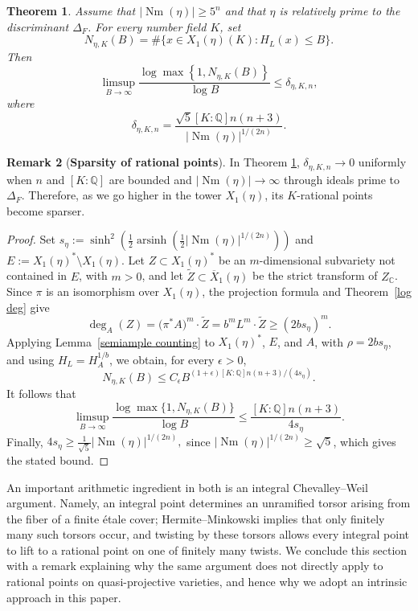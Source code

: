 \documentclass[12 pt]{amsart}
\newtheorem{theorem}{Theorem}[section]
\theoremstyle{definition}
\newtheorem{Remark}[theorem]{Remark}
\newcommand{\Nm}{\operatorname{Nm}}
\begin{document}
\begin{theorem}\label{log grow}
Assume that \(|\Nm(\eta)|\geq5^n\) and that \(\eta\) is relatively prime to the discriminant \(\Delta_F\).
For every number field \(K\), set
\[
N_{\eta,K}(B)
=\#\{x\in X_1(\eta)(K):H_L(x)\leq B\}.
\]
Then
\[
\limsup_{B\to\infty}
\frac{\log\max\left\{1,N_{\eta,K}(B)\right\}}
{\log B}
\leq \delta_{\eta,K,n},
\]
where
\[
\delta_{\eta,K,n}
=
\frac{\sqrt5[K:\mathbb Q]n(n+3)}
{|\Nm(\eta)|^{1/(2n)}}.
\]
\end{theorem}

\begin{Remark}[\textbf{Sparsity of rational points}]
In Theorem \ref{log grow}, \(\delta_{\eta,K,n}\to0\) uniformly when \(n\) and
\([K:\mathbb Q]\) are bounded and
\(|\Nm(\eta)|\to\infty\) through ideals prime to \(\Delta_F\). Therefore, as we go higher in the tower \(X_1(\eta)\), its \(K\)-rational points become sparser.
\end{Remark}

\begin{proof}
Set
\(
s_\eta
:=
\sinh^2\left(
\frac12\operatorname{arsinh}
\left(\frac12|\Nm(\eta)|^{1/(2n)}\right)
\right)\)
and
\( E:=X_1(\eta)^*\setminus X_1(\eta).
\)
Let \(Z\subset X_1(\eta)^*\) be an \(m\)-dimensional subvariety not contained in \(E\), with \(m>0\), and let \(\widetilde Z\subset\overline X_1(\eta)\) be the strict transform of \(Z_{\mathbb C}\). Since \(\pi\) is an isomorphism over \(X_1(\eta)\), the projection formula and Theorem~\ref{log deg} give
\[
\deg_A(Z)
=
\bigl(\pi^*A\bigr)^m\cdot\widetilde Z
=
b^mL^m\cdot\widetilde Z
\geq
(2bs_\eta)^m.
\]
 Applying Lemma~\ref{semiample counting} to \(X_1(\eta)^*\), \(E\), and \(A\), with \(\rho=2bs_\eta\), and using \(H_L=H_A^{1/b}\), we obtain, for every \(\epsilon>0\),
\[
N_{\eta,K}(B)
\leq
C_\epsilon B^{(1+\epsilon)[K:\mathbb Q]n(n+3)/(4s_\eta)}.
\]
It follows that
\[
\limsup_{B\to\infty}
\frac{\log\max\{1,N_{\eta,K}(B)\}}{\log B}
\leq
\frac{[K:\mathbb Q]n(n+3)}{4s_\eta}.
\]
Finally,
\(
4s_\eta
\geq
\frac{1}{\sqrt5}|\Nm(\eta)|^{1/(2n)},
\)
since \(|\Nm(\eta)|^{1/(2n)}\geq\sqrt5\), which gives the stated bound.
\end{proof}


 An important arithmetic ingredient in both
\cite{ellenberg2023sparsity,brunebarbe2022counting} is an integral
Chevalley--Weil argument. Namely, an integral point determines an
unramified torsor arising from the fiber of a finite \'etale cover;
Hermite--Minkowski implies that only finitely many such torsors occur,
and twisting by these torsors allows every integral point to lift to a
rational point on one of finitely many twists. We conclude this section
with a remark explaining why the same argument does not directly apply
to rational points on quasi-projective varieties, and hence why we adopt
an intrinsic approach in this paper.
\end{document}
